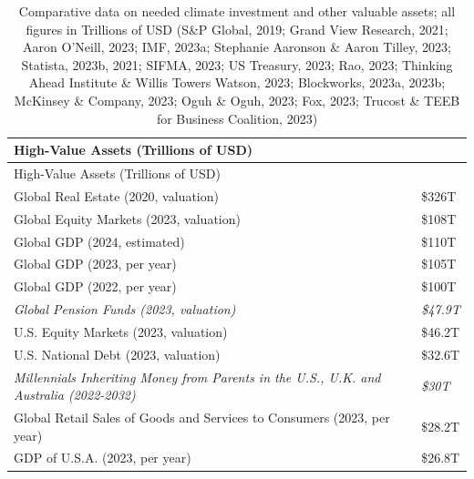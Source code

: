 \documentclass[
  letterpaper,
  DIV=11,
  numbers=noendperiod]{scrartcl}
\begin{document}
\begin{longtable}[]{@{}
  >{\raggedright\arraybackslash}p{}
  >{\raggedright\arraybackslash}p{}@{}}
\caption{Comparative data on needed climate investment and other
valuable assets; all figures in Trillions of USD (S\&P Global, 2019;
Grand View Research, 2021; Aaron O'Neill, 2023; IMF, 2023a; Stephanie
Aaronson \& Aaron Tilley, 2023; Statista, 2023b, 2021; SIFMA, 2023; US
Treasury, 2023; Rao, 2023; Thinking Ahead Institute \& Willis Towers
Watson, 2023; Blockworks, 2023a, 2023b; McKinsey \& Company, 2023; Oguh
\& Oguh, 2023; Fox, 2023; Trucost \& TEEB for Business Coalition,
2023)}\tabularnewline
\toprule\noalign{}
\begin{minipage}[b]{\linewidth}\raggedright
High-Value Assets (Trillions of USD)
\end{minipage} & \begin{minipage}[b]{\linewidth}\raggedright
\end{minipage} \\
\midrule\noalign{}
\endfirsthead
\toprule\noalign{}
\begin{minipage}[b]{\linewidth}\raggedright
High-Value Assets (Trillions of USD)
\end{minipage} & \begin{minipage}[b]{\linewidth}\raggedright
\end{minipage} \\
\midrule\noalign{}
\endhead
\bottomrule\noalign{}
\endlastfoot
Global Real Estate (2020, valuation) & \$326T \\
Global Equity Markets (2023, valuation) & \$108T \\
Global GDP (2024, estimated) & \$110T \\
Global GDP (2023, per year) & \$105T \\
Global GDP (2022, per year) & \$100T \\
\emph{Global Pension Funds (2023, valuation)} & \emph{\$47.9T} \\
U.S. Equity Markets (2023, valuation) & \$46.2T \\
U.S. National Debt (2023, valuation) & \$32.6T \\
\emph{Millennials Inheriting Money from Parents in the U.S., U.K. and
Australia (2022-2032)} & \emph{\$30T} \\
Global Retail Sales of Goods and Services to Consumers (2023, per year)
& \$28.2T \\
GDP of U.S.A. (2023, per year) & \$26.8T \\

\end{longtable}
\end{document}
